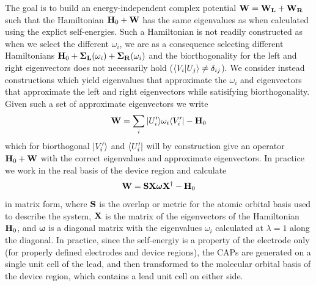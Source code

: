 The goal is to build an energy-independent complex potential
$\mathbf{W} = \mathbf{W_L} + \mathbf{W_R}$
such that the Hamiltonian $\mathbf{H}_0 + \mathbf{W}$ has the same eigenvalues
as when calculated using the explict self-energies. Such a Hamiltonian is
not readily constructed as when we select the different $\omega_i$, we are
as a consequence selecting different Hamiltonians
$\mathbf{H}_0 + \mathbf{\Sigma_L}(\omega_i) + \mathbf{\Sigma_R}(\omega_i)$
and the biorthogonality for the left and right eigenvectors does not
necessarily hold ($\langle V_i|U_j \rangle \ne \delta_{ij}$). We consider instead
constructions which yield eigenvalues that approximate the $\omega_i$  and
eigenvectors that approximate the left and right eigenvectors while
satisifying biorthogonality. Given such a set of approximate eigenvectors
we write
\begin{equation}
    \mathbf{W} = \sum_i  |U^\prime_i \rangle \omega_i \langle V^\prime_i| - \mathbf{H}_0
    \label{eq:capsdefUV}
\end{equation}
which for biorthogonal $|V^\prime_i \rangle$ and $\langle U^\prime_i|$ will by
construction give an operator $\mathbf{H}_0 + \mathbf{W}$ with the correct eigenvalues
and approximate eigenvectors. In practice we work in the real basis of the
device region and calculate
\begin{equation}
    \mathbf{W} = \mathbf{S} \mathbf{X} \boldsymbol{\omega}\mathbf{X}^\dagger - \mathbf{H}_0
    \label{eq:capsdefX}
\end{equation}
in matrix form, where $\mathbf{S}$ is the overlap or metric for the atomic
orbital basis used to describe the system, $\mathbf{X}$ is the matrix of the
eigenvectors of the Hamiltonian $\mathbf{H}_0$, and $\boldsymbol{\omega}$ is a
diagonal matrix with the eigenvalues $\omega_i$ calculated at
$\lambda = 1$ along the diagonal.
In practice, since the self-energiy is a property of the electrode only
(for properly defined electrodes and device regions), the \acp{CAP} are
generated on a single unit cell of the lead, and then transformed to the
molecular orbital basis of the device region, which contains a lead unit
cell on either side.

